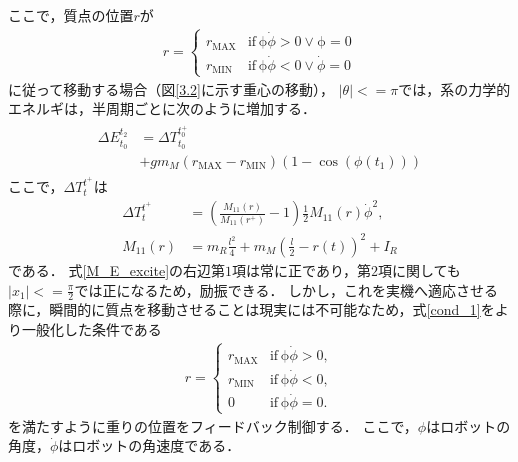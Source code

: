 ここで，質点の位置$r$が
\begin{eqnarray}\label{cond_1}
        r
        =
        \begin{cases}
        r_\text{MAX} &\mathrm{if}\,\mathrm\phi \dot{\phi} > 0 \lor \mathrm\phi = 0\\
        r_\text{MIN} &\mathrm{if}\,\mathrm\phi \dot{\phi} < 0 \lor \dot{\phi} = 0
        \label{eq:setpoint}
        \end{cases}
\end{eqnarray}
に従って移動する場合（図\ref{3.2}に示す重心の移動），
$\left|\theta\right|<=\pi$では，系の力学的エネルギは，半周期ごとに次のように増加する．
\begin{eqnarray}\label{M_E_excite}
\begin{split} 
\Delta E_{t_{0}}^{t_{2}}&=\Delta T_{t_{0}}^{t_{0}^{+}}\\
&+g m_{M}\left(r_{\mathrm{MAX}}-r_{\mathrm{MIN}}\right)\left(1-\cos \left(\phi\left(t_{1}\right)\right)\right)
\end{split}
\end{eqnarray}
ここで，$\Delta T_{t}^{t^{+}}$は
\begin{eqnarray}
\Delta T_{t}^{t^{+}} & =\left(\frac{M_{11}\left(r\right)}{M_{11}\left(r^{+}\right)}-1\right) \frac{1}{2} M_{11}\left(r\right) {\dot{\phi}}^{2}, \\
M_{11}(r) & = m_{R} \frac{l^{2}}{4}+m_{M}\left(\frac{l}{2}-r(t)\right)^{2}+I_{R}
\end{eqnarray}
である．
式\ref{M_E_excite}の右辺第$1$項は常に正であり，第$2$項に関しても$\left|x_{1}\right|<=\frac{\pi}{2}$では正になるため，励振できる．
しかし，これを実機へ適応させる際に，瞬間的に質点を移動させることは現実には不可能なため，式\ref{cond_1}をより一般化した条件である
\begin{eqnarray}
r
=
\begin{cases}
r_\text{MAX} &\mathrm{if}\,\mathrm\phi \dot{\phi} > 0,\\
r_\text{MIN} &\mathrm{if}\,\mathrm\phi \dot{\phi} < 0,\\
0 &\mathrm{if}\,\mathrm\phi \dot{\phi} = 0.
\label{eq:setpoint}
\end{cases}
\end{eqnarray}
を満たすように重りの位置をフィードバック制御する．
ここで，$\phi$はロボットの角度，$\dot{\phi}$はロボットの角速度である．
